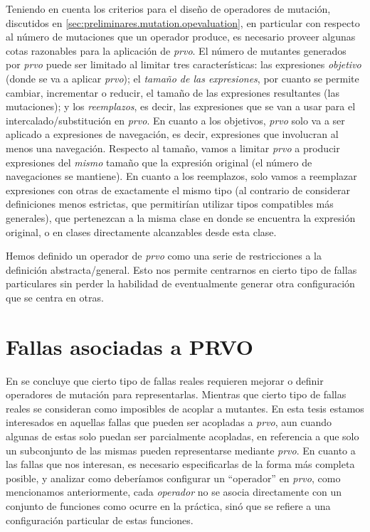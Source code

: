 Teniendo en cuenta los criterios para el dise\~no de operadores de mutaci\'on, discutidos en \ref{sec:preliminares.mutation.opevaluation}, en particular con respecto al n\'umero de mutaciones que un operador produce, es necesario proveer algunas cotas razonables para la aplicaci\'on de \emph{prvo}. El n\'umero de mutantes generados por \emph{prvo} puede ser limitado al limitar tres caracter\'isticas: las expresiones \emph{objetivo} (donde se va a aplicar \emph{prvo}); el \emph{tama\~no de las expresiones}, por cuanto se permite cambiar, incrementar o reducir, el tama\~no de las expresiones resultantes (las mutaciones); y los \emph{reemplazos}, es decir, las expresiones que se van a usar para el intercalado/substituci\'on en \emph{prvo}. En cuanto a los objetivos, \emph{prvo} solo va a ser aplicado a expresiones de navegaci\'on, es decir, expresiones que involucran al menos una navegaci\'on. Respecto al tama\~no, vamos a limitar \emph{prvo} a producir expresiones del \emph{mismo} tama\~no que la expresi\'on original (el n\'umero de navegaciones se mantiene). En cuanto a los reemplazos, solo vamos a reemplazar expresiones con otras de exactamente el mismo tipo (al contrario de considerar definiciones menos estrictas, que permitir\'ian utilizar tipos compatibles m\'as generales), que pertenezcan a la misma clase en donde se encuentra la expresi\'on original, o en clases directamente alcanzables desde esta clase.

Hemos definido un operador de \emph{prvo} como una serie de restricciones a la definici\'on abstracta/general. Esto nos permite centrarnos en cierto tipo de fallas particulares sin perder la habilidad de eventualmente generar otra configuraci\'on que se centra en otras.

\section{Fallas asociadas a PRVO}
\label{sec:prvo.prvoTargetedFaults}

En \cite{bibliography.mutation.evaluation.valid-substitute} se concluye que cierto tipo de fallas reales requieren mejorar o definir operadores de mutaci\'on para representarlas. Mientras que cierto tipo de fallas reales se consideran como imposibles de acoplar a mutantes. En esta tesis estamos interesados en aquellas fallas que pueden ser acopladas a \emph{prvo}, aun cuando algunas de estas solo puedan ser parcialmente acopladas, en referencia a que solo un subconjunto de las mismas pueden representarse mediante \emph{prvo}. En cuanto a las fallas que nos interesan, es necesario especificarlas de la forma m\'as completa posible, y analizar como deber\'iamos configurar un ``operador'' en \emph{prvo}, como mencionamos anteriormente, cada \emph{operador} no se asocia directamente con un conjunto de funciones como ocurre en la pr\'actica, sin\'o que se refiere a una configuraci\'on particular de estas funciones.


